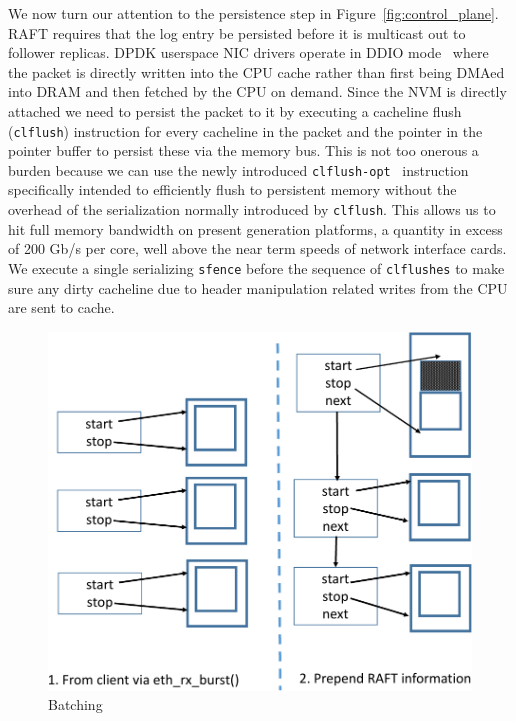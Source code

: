 \documentclass[pageno]{jpaper}
\begin{document}
We now turn our attention to the persistence step in
Figure~\ref{fig:control_plane}. RAFT requires that the log entry be persisted
before it is multicast out to follower replicas. DPDK userspace NIC drivers
operate in DDIO mode~\cite{ddio} where the packet is directly written into the
CPU cache rather than first being DMAed into DRAM and then fetched by the CPU on
demand. Since the NVM is directly attached we need to persist the packet to it
by executing a cacheline flush ({\tt clflush}) instruction for every cacheline
in the packet and the pointer in the pointer buffer to persist these via the
memory bus. This is not too onerous a burden because we can use the newly
introduced {\tt clflush-opt}~\cite{clflush_opt} instruction specifically
intended to efficiently flush to persistent memory without the overhead of the
serialization normally introduced by {\tt clflush}. This allows us to hit full
memory bandwidth on present generation platforms, a quantity in excess of 200
Gb/s per core, well above the near term speeds of network interface cards. We
execute a single serializing {\tt sfence} before the sequence of {\tt clflushes}
to make sure any dirty cacheline due to header manipulation related writes from
the CPU are sent to cache.

\begin{figure}
  \centering
  \includegraphics[scale=0.4]{figures2/batching.pdf}
  \caption{Batching}
  \label{fig:batching}
\end{figure}
\end{document}
